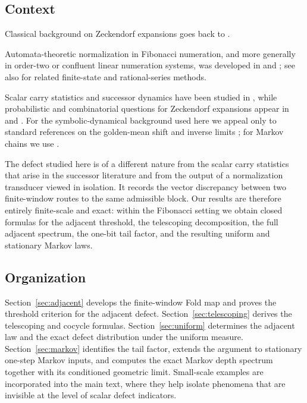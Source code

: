 \documentclass[11pt,reqno]{amsart}
\numberwithin{equation}{section}
\theoremstyle{plain}
\theoremstyle{definition}
\theoremstyle{remark}
\begin{document}
\subsection{Context}

Classical background on Zeckendorf expansions goes back to
\cite{Lekkerkerker1952,Zeckendorf1972,Carlitz1968,CarlitzScovHoggatt1972,%
Fraenkel1985}.

Automata-theoretic normalization in Fibonacci numeration, and
more generally in order-two or confluent linear numeration systems, was
developed in
\cite{Frougny1988,Frougny1991,FrougnyConfluent1992,Frougny1992,%
FrougnySolomyak1996}
and
\cite{FrougnySakarovitch1999,Frougny1999,FrougnyS2010,LabbeLepsova2023,%
ShallitShan2024,MarquesTrojovsky2025}; see also
\cite{BerstelReutenauer2011} for related finite-state and rational-series
methods.

Scalar carry statistics and successor dynamics have been studied in
\cite{Frougny1996Successor,Frougny1997Sequential,%
AhlbachUsatineFrougnyPippenger2013,BertheFrougnyRigoSakarovitch2020}, while
probabilistic and combinatorial questions for Zeckendorf expansions appear in
\cite{KologluKoppMillerWang2011,DrmotaSteiner2002,Steiner2005,MillerWang2012}
and
\cite{Griffiths2010,BaratGrabner2014,Dekking2021,Hosten2024}.  For the
symbolic-dynamical background used here we appeal only to standard references
on the golden-mean shift and inverse limits \cite{LindMarcus1995,Kitchens1998};
for Markov chains we use
\cite{Parry1964,Norris1997,LevinPeresWilmer2009MarkovMixing}.

The defect studied here is of a different nature from the scalar carry
statistics that arise in the successor literature and from the output of a
normalization transducer viewed in isolation.  It records the vector
discrepancy between two finite-window routes to the same admissible block.
Our results are therefore entirely finite-scale and exact: within the
Fibonacci setting we obtain closed formulas for the adjacent threshold, the
telescoping decomposition, the full adjacent spectrum, the one-bit tail
factor, and the resulting uniform and stationary Markov laws.

\subsection{Organization}

Section~\ref{sec:adjacent} develops the finite-window Fold map and proves the
threshold criterion for the adjacent defect.  Section~\ref{sec:telescoping}
derives the telescoping and cocycle formulas.  Section~\ref{sec:uniform}
determines the adjacent law and the exact defect distribution under the
uniform measure.  Section~\ref{sec:markov} identifies the tail factor, extends
the argument to stationary one-step Markov inputs, and computes the exact
Markov depth spectrum together with its conditioned geometric limit.  Small-scale
examples are incorporated into the main text, where they help isolate
phenomena that are invisible at the level of scalar defect indicators.
\end{document}
